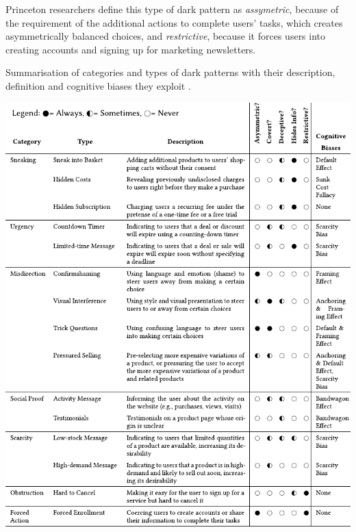     Princeton researchers define this type of dark pattern as \emph{assymetric}, because of the requirement of the additional actions to complete users' tasks, which creates asymmetrically balanced choices, and \emph{restrictive}, because it forces users into creating accounts and signing up for marketing newsletters.

\begin{table}
    \centering
    \caption{Summarisation of categories and types of dark patterns with their description, definition and cognitive biases they exploit \cite{dark-patterns-at-scale}.}\label{tab:darkpatterns}
    \includegraphics[width=1\textwidth]{media/dp-table.pdf}
\end{table}